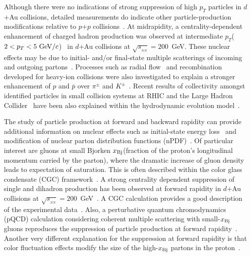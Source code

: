 \documentclass[twocolumn,letterpaper,aps,prc,longbibliography,superscriptaddress,nofootinbib,floatfix]{revtex4-2}
\newcommand{\pt}{\mbox{$p_T$}\xspace}
\newcommand{\sqsntwo}{\mbox{$\sqrt{s_{_{NN}}}=200$~GeV}\xspace}
\newcommand{\pp}{\mbox{$p$+$p$}\xspace}
\newcommand{\dau}{\mbox{$d$$+$Au}\xspace}
\newcommand{\xbj}{\mbox{$x_{\rm Bj}$}\xspace}
\begin{document}
Although there were no indications of strong suppression of high \pt 
particles in \dau collisions, detailed measurements do indicate other 
particle-production modifications relative to \pp 
collisions~\cite{Arsene:2004ux,Adams:2006uz,Adare:2011sc,Adare:2013esx,Adare:2013lkk}. 
At midrapidity, a centrality-dependent enhancement of charged hadron 
production was observed at intermediate \pt ($2<\pt<5~{\rm 
GeV}/c$)~\cite{Adare:2013esx} in \dau collisions at \sqsntwo.  These 
nuclear effects may be due to initial- and/or final-state multiple 
scatterings of incoming and outgoing 
partons~\cite{Accardi:2002ik,Kang:2014hha}. Processes such as radial 
flow~\cite{Hirano:2003pw} and recombination~\cite{Hwa:2002tu} developed 
for heavy-ion collisions were also investigated to explain a stronger 
enhancement of $p$ and $\bar{p}$ over $\pi^{\pm}$ and 
$K^{\pm}$~\cite{Adare:2013esx}. Recent results of collectivity amongst 
identified particles in small collision systems at RHIC and the Large 
Hadron Collider~\cite{Nagle:2018nvi} have been also explained 
within the hydrodynamic evolution 
model~\cite{Habich:2014jna,Shen:2016zpp}.

The study of particle production at forward and backward rapidity can 
provide additional information on nuclear effects such as initial-state 
energy loss~\cite{Qiu:2004da} and modification of nuclear parton 
distribution functions 
(nPDF)~\cite{Geesaman:1995yd,deFlorian:2011fp,Kovarik:2015cma,Eskola:2016oht,AbdulKhalek:2019mzd}. 
Of particular interest are gluons at small Bjorken \xbj (fraction of the 
proton's longitudinal momentum carried by the parton), where the 
dramatic increase of gluon density leads to expectation of saturation. 
This is often described within the color glass condensate (CGC) 
framework~\cite{McLerran:1993ka}. A strong centrality dependent 
suppression of single and dihadron production has been observed at 
forward rapidity in \dau collisions at 
\sqsntwo~\cite{Arsene:2004ux,Adams:2006uz,Adare:2011sc}. A CGC 
calculation provides a good description of the experimental 
data~\cite{Marquet:2007vb,Albacete:2010bs}. Also, a perturbative quantum 
chromodynamics (pQCD) calculation considering coherent multiple 
scattering with small-\xbj gluons reproduces the suppression of 
particle production at forward rapidity~\cite{Qiu:2004da,Kang:2011bp}. 
Another very different explanation for the suppression at forward 
rapidity is that color fluctuation effects modify the size of the 
high-\xbj partons in the proton~\cite{Alvioli:2014eda,Alvioli:2017wou}.
\end{document}
